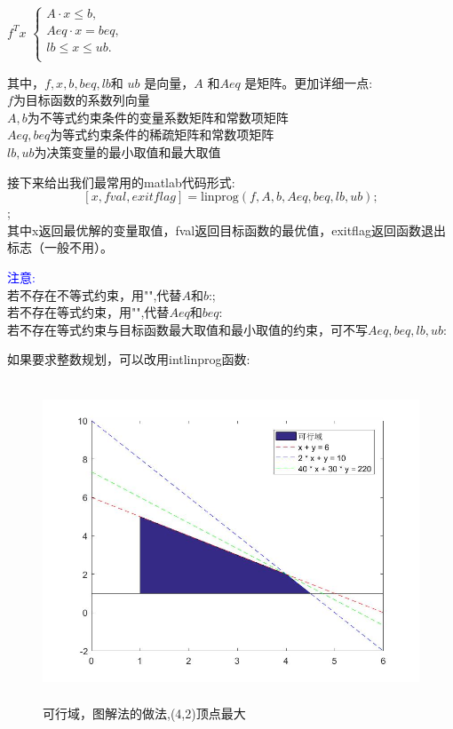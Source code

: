 \documentclass[a4paper,20pt]{article}
\begin{document}
        $f^Tx$ $\left\{\begin{matrix}
        A \cdot x \leq b,\\
        Aeq \cdot x = beq,\\
        lb\leq x \leq ub.\\
       \end{matrix}\right.$
       \par 其中，$f,x,b,beq,lb$和 $ub$ 是向量，$A$ 和$ Aeq$ 是矩阵。更加详细一点:
       \\$f$为目标函数的系数列向量
       \\ $A,b$为不等式约束条件的变量系数矩阵和常数项矩阵
       \\$Aeq,beq$为等式约束条件的稀疏矩阵和常数项矩阵
       \\$lb,ub$为决策变量的最小取值和最大取值
       \par 接下来给出我们最常用的matlab代码形式:
       \[ [x, fval,exitflag] = \text{linprog}(f, A, b, Aeq, beq, lb, ub); \] ;
       \\其中x返回最优解的变量取值，fval返回目标函数的最优值，exitflag返回函数退出标志（一般不用）。
       \par \textcolor{blue}{注意:}
       \\若不存在不等式约束，用"\text{[ ]}",代替$A$和$b$:;
       \\若不存在等式约束，用"\text{[ ]}",代替$Aeq$和$beq$:
       \\若不存在等式约束与目标函数最大取值和最小取值的约束，可不写$Aeq,beq,lb,ub$:
       \par 如果要求整数规划，可以改用intlinprog函数:
    \begin{figure}[H]
        \centering
        \includegraphics[width=340pt,height=270pt]{figure1.jpg}
        \caption{可行域，图解法的做法,(4,2)顶点最大}
    \end{figure}
\end{document}
